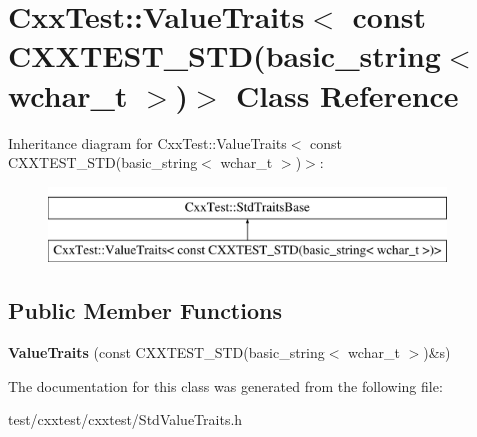 \hypertarget{classCxxTest_1_1ValueTraits_3_01const_01CXXTEST__STD_07basic__string_3_01wchar__t_01_4_08_4}{\section{Cxx\-Test\-:\-:Value\-Traits$<$ const C\-X\-X\-T\-E\-S\-T\-\_\-\-S\-T\-D(basic\-\_\-string$<$ wchar\-\_\-t $>$)$>$ Class Reference}
\label{classCxxTest_1_1ValueTraits_3_01const_01CXXTEST__STD_07basic__string_3_01wchar__t_01_4_08_4}
}
Inheritance diagram for Cxx\-Test\-:\-:Value\-Traits$<$ const C\-X\-X\-T\-E\-S\-T\-\_\-\-S\-T\-D(basic\-\_\-string$<$ wchar\-\_\-t $>$)$>$\-:\begin{figure}[H]
\begin{center}
\leavevmode
\includegraphics[height=2.000000cm]{classCxxTest_1_1ValueTraits_3_01const_01CXXTEST__STD_07basic__string_3_01wchar__t_01_4_08_4}
\end{center}
\end{figure}
\subsection*{Public Member Functions}
\begin{DoxyCompactItemize}
\item 
\hypertarget{classCxxTest_1_1ValueTraits_3_01const_01CXXTEST__STD_07basic__string_3_01wchar__t_01_4_08_4_afeeca3823b7bfe20436ee85fc8bc0a32}{{\bfseries Value\-Traits} (const C\-X\-X\-T\-E\-S\-T\-\_\-\-S\-T\-D(basic\-\_\-string$<$ wchar\-\_\-t $>$)\&s)}\label{classCxxTest_1_1ValueTraits_3_01const_01CXXTEST__STD_07basic__string_3_01wchar__t_01_4_08_4_afeeca3823b7bfe20436ee85fc8bc0a32}

\end{DoxyCompactItemize}


The documentation for this class was generated from the following file\-:\begin{DoxyCompactItemize}
\item 
test/cxxtest/cxxtest/Std\-Value\-Traits.\-h\end{DoxyCompactItemize}
